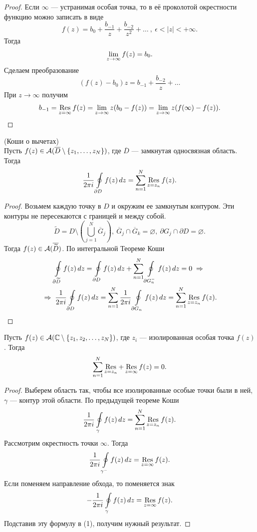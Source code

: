 	\begin{proof}
		Если $\infty$ --- устранимая особая точка, то в её проколотой окрестности функцию можно записать в виде
		\[ f(z) = b_0 + \frac{b_{-1}}{z} + \frac{b_{-2}}{z^2} + \ldots\ ,\ \epsilon<|z|<+\infty. \]
		Тогда 
		\[ \lim\limits_{z\to\infty}f(z) = b_0. \]
		Сделаем преобразование
		\[ (f(z)-b_0)z = b_{-1}+\frac{b_{-2}}{z}+\ldots \]
		При $z\to\infty$ получим
		\[ b_{-1} = \mathop{\operatorname{Res}}\limits_{z=\infty}f(z) = \lim\limits_{z\to\infty} z(b_0-f(z))= \lim\limits_{z\to\infty} z(f(\infty)-f(z)). \]
	\end{proof}
	\begin{theorem*}
		(Коши о вычетах)\\
		\indent Пусть $f(z)\in\mathcal{A}(\overline D\setminus \{ z_1,\ldots,z_N \})$, где $\overline D$ --- замкнутая односвязная область. Тогда 
		\[ \frac{1}{2\pi i}\oint\limits_{\partial D}f(z)\,dz = \sum\limits_{n=1}^N \mathop{\operatorname{Res}}\limits_{z=z_n}f(z). \]
	\end{theorem*}
	\begin{proof}
		Возьмем каждую точку в $D$ и окружим ее замкнутым контуром. Эти контуры не пересекаются с границей и между собой.
		\[ \widetilde D = D\setminus(\bigcup_{j=1}^N\overline G_j),\ \overline G_j\cap\overline G_k=\varnothing,\ \partial G_j
		\cap\partial D=\varnothing. \] 
		Тогда $f(z)\in\mathcal{A}(\overline{\widetilde D})$. По интегральной Теореме Коши 
		\begin{multline*}
			\oint\limits_{\partial\widetilde D} f(z)\,dz = \oint\limits_{\partial D} f(z)\,dz + \sum\limits_{n=1}^N\oint\limits_{\partial G_n^-}f(z)\,dz = 0\;\Rightarrow\;\\ \;\Rightarrow\; \frac{1}{2\pi i}\oint\limits_{\partial D}f(z)\,dz = \sum\limits_{n=1}^{N}\frac{1}{2\pi i}\oint\limits_{\partial G_n}f(z)\,dz = \sum\limits_{n=1}^{N}\mathop{\operatorname{Res}}\limits_{z=z_n}f(z).
		\end{multline*}
	\end{proof}
	\begin{theorem}
		Пусть $f(z)\in\mathcal{A}(\mathbb{C}\setminus\{ z_1,z_2,\ldots,z_N \})$, где $z_i$ --- изолированная особая точка $f(z)$. Тогда
		\[ \sum\limits_{n = 1}^{N}\mathop{\operatorname{Res}}\limits_{z=z_n} + \mathop{\operatorname{Res}}\limits_{z=\infty} f(z) = 0. \]	
	\end{theorem}
	\begin{proof}
		Выберем область так, чтобы все изолированные особые точки были в ней, $\gamma$ --- контур этой области. По предыдущей теореме Коши
		\setcounter{equation}{0}
		\begin{equation}
			\frac{1}{2\pi i}\oint\limits_\gamma f(z)\,dz = \sum\limits_{n=1}^N \mathop{\operatorname{Res}}\limits_{z=z_n} f(z).
		\end{equation}
		Рассмотрим окрестность точки $\infty$. Тогда
		\[ \frac{1}{2\pi i}\oint\limits_{\gamma^-}f(z)\,dz = \mathop{\operatorname{Res}}\limits_{z = \infty}f(z). \]
		Если поменяем направление обхода, то поменяется знак
		\[ -\frac{1}{2\pi i}\oint\limits_\gamma f(z)\,dz = \mathop{\operatorname{Res}}\limits_{z = \infty}f(z). \]
		Подставив эту формулу в (1), получим нужный результат.
	\end{proof}
